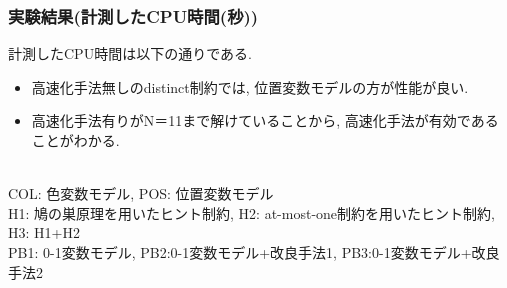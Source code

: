 \documentclass [dvipdfmx,11pt]{beamer}
\begin{document}
\begin{frame}
    \frametitle{実験結果(計測したCPU時間(秒))}
    計測したCPU時間は以下の通りである.
    \begin{block}{}
        {\tiny  }
    \end{block}
    \begin{itemize}
        \item 高速化手法無しのdistinct制約では, 位置変数モデルの方が性能が良い.
        \item 高速化手法有りがN＝11まで解けていることから, 高速化手法が有効であることがわかる.
    \end{itemize}
    \\
    \vspace{-3mm}
    {\tiny COL: 色変数モデル, POS: 位置変数モデル}\\
    \vspace{-3mm}
    {\tiny H1: 鳩の巣原理を用いたヒント制約, H2: at-most-one制約を用いたヒント制約, H3: H1+H2}\\
    \vspace{-3mm}
    {\tiny PB1: 0-1変数モデル, PB2:0-1変数モデル+改良手法1, PB3:0-1変数モデル+改良手法2}\\
\end{frame}
\end{document}

